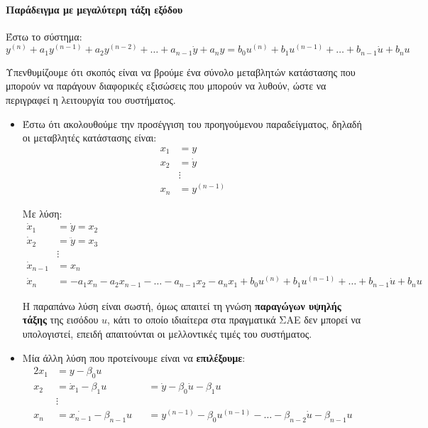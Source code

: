 \documentclass[11pt,a4paper,notitlepage,fleqn]{article}
\begin{document}
\paragraph{Παράδειγμα με μεγαλύτερη τάξη εξόδου}
\label{sec:nontd_highorder_system}
Έστω το σύστημα:
\[
y^{(n)} + a_1y^{(n-1)} + a_2y^{(n-2)} + \dots + a_{n-1}\dot y + a_n y =
b_0 u^{(n)} + b_1u^{(n-1)} + \dots + b_{n-1}\dot u + b_n u
\label{eq:nontd_highorder_system}
\]

Υπενθυμίζουμε ότι σκοπός είναι να βρούμε ένα σύνολο μεταβλητών κατάστασης που μπορούν
να παράγουν διαφορικές εξισώσεις που μπορούν να λυθούν, ώστε να περιγραφεί η λειτουργία του
συστήματος.

\begin{itemize}
	\item Έστω ότι ακολουθούμε την προσέγγιση του προηγούμενου παραδείγματος, δηλαδή οι
	μεταβλητές κατάστασης είναι:
	\begin{align*}
	x_1 &= y \\
	x_2 &= \dot y \\
	&\vdots \\
	x_n &= y^{(n-1)}
	\end{align*}
	
	Με λύση:
	\begin{align*}
	\dot x_1 &= \dot y = x_2\\
	\dot x_2 &= \ddot y = x_3 \\
	&\vdots \\
	\dot x_{n-1} &= x_n\\
	\dot x_n &= -a_1x_n -a_2x_{n-1} - \dots - a_{n-1}x_2 -a_nx_1 + b_0 u^{(n)} + b_1u^{(n-1)} + \dots + b_{n-1}\dot u + b_n u
	\end{align*}

     Η παραπάνω λύση είναι σωστή, όμως απαιτεί τη γνώση \textbf{παραγώγων υψηλής τάξης} της
     εισόδου \( u \), κάτι το οποίο ιδιαίτερα στα πραγματικά ΣΑΕ δεν μπορεί να υπολογιστεί,
     επειδή απαιτούνται οι μελλοντικές τιμές του συστήματος.
     \item Μία άλλη λύση που προτείνουμε είναι να \textbf{επιλέξουμε}:
     \begin{alignat*}{2}
     	x_1 &= y - \beta_0 u && \\
     	x_2 &= \dot x_1 - \beta_1 u &&= \dot y - \beta_0\dot u - \beta_1u \\
     	&\vdots && \\
     	x_n &= \dot{x_{n-1}} - \beta_{n-1}u
     	&&= y^{(n-1)} - \beta_0u^{(n-1)} - \dots - \beta_{n-2}\dot u - \beta_{n-1}u
     \end{alignat*}
     

\end{itemize}
\end{document}

